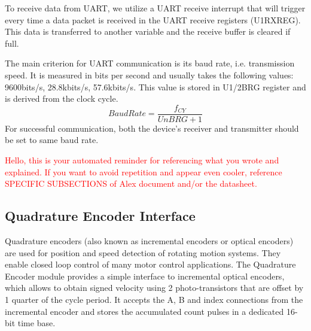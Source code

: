 \noindent
To receive data from UART, we utilize a UART receive interrupt that will trigger every time a data packet is received in the UART receive registers (U1RXREG). This data is transferred to another variable and the receive buffer is cleared if full.


\noindent
The main criterion for UART communication is its baud rate, i.e. transmission speed. It is measured in bits per second and usually takes the following values: 9600bits/s, 28.8kbits/s, 57.6kbits/s.
This value is stored in U1/2BRG register and is derived from the clock cycle.
$$BaudRate = \frac{f_{CY}}{UnBRG+1}$$
For successful communication, both the device’s receiver and transmitter should be set to same baud rate.

\textcolor{red}{Hello, this is your automated reminder for referencing what you wrote and explained. If you want to avoid repetition and appear even cooler, reference SPECIFIC SUBSECTIONS of Alex document and/or the datasheet.}

\subsection{Quadrature Encoder Interface}

Quadrature encoders (also known as incremental encoders or optical encoders) are used for position and speed detection of rotating motion systems. They enable closed loop control of many motor control applications.
\vskip 0.2in
\noindent
The Quadrature Encoder module provides a simple interface to incremental optical encoders, which allows to obtain signed velocity using 2 photo-transistors that are offset by 1 quarter of the cycle period. It accepts the A, B and index connections from the incremental encoder and stores the accumulated count pulses in a dedicated 16-bit time base.

